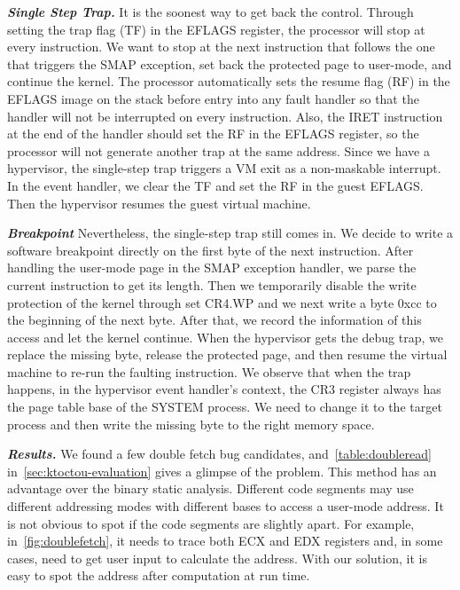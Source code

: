 \textbf{\textit{Single Step Trap.}} It is the soonest way to get back the control. Through setting the trap flag (TF) in the EFLAGS register, the processor will stop at every instruction. We want to stop at the next instruction that follows the one that triggers the SMAP exception, set back the protected page to user-mode, and continue the kernel. The processor automatically sets the resume flag (RF) in the EFLAGS image on the stack before entry into any fault handler so that the handler will not be interrupted on every instruction. Also, the IRET instruction at the end of the handler should set the RF in the EFLAGS register, so the processor will not generate another trap at the same address. Since we have a hypervisor, the single-step trap triggers a VM exit as a non-maskable interrupt. In the event handler, we clear the TF and set the RF in the guest EFLAGS. Then the hypervisor resumes the guest virtual machine.

\textbf{\textit{Breakpoint}} Nevertheless, the single-step trap still comes in. We decide to write a software breakpoint directly on the first byte of the next instruction. After handling the user-mode page in the SMAP exception handler, we parse the current instruction to get its length. Then we temporarily disable the write protection of the kernel through set CR4.WP and we next write a byte 0xcc to the beginning of the next byte. After that, we record the information of this access and let the kernel continue. When the hypervisor gets the debug trap, we replace the missing byte, release the protected page, and then resume the virtual machine to re-run the faulting instruction. We observe that when the trap happens, in the hypervisor event handler's context, the CR3 register always has the page table base of the SYSTEM process. We need to change it to the target process and then write the missing byte to the right memory space.

\textbf{\textit{Results.}} 
We found a few double fetch bug candidates, and~\autoref{table:doubleread} in~\autoref{sec:ktoctou-evaluation} gives a glimpse of the problem. This method has an advantage over the binary static analysis. Different code segments may use different addressing modes with different bases to access a user-mode address.  It is not obvious to spot if the code segments are slightly apart. For example, in~\autoref{fig:doublefetch}, it needs to trace both ECX and EDX registers and, in some cases, need to get user input to calculate the address. With our solution, it is easy to spot the address after computation at run time.


